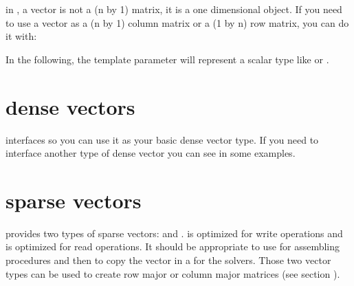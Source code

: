 \documentclass[a4paper,11pt,english]{sphinxmanual}
\begin{document}
in , a vector is not a (n by 1) matrix, it is a one dimensional object. If you need to use a vector as a (n by 1) column matrix or a (1 by n) row matrix, you can do it with:

\begin{sphinxVerbatim}[commandchars=\\\{\}]
 
 
\end{sphinxVerbatim}

In the following, the template parameter  will represent a scalar type like  or .


\section{dense vectors}
\label{\detokenize{gmm/matrix:dense-vectors}}
 interfaces  so you can use it as your basic dense vector type.
If you need to interface another type of dense vector you can see in 
some examples.


\section{sparse vectors}
\label{\detokenize{gmm/matrix:sparse-vectors}}
 provides two types of sparse vectors:  and .  is optimized for write operations and  is optimized for read operations. It should be appropriate to use  for assembling procedures and then to copy the vector in a  for the solvers. Those two vector types can be used to create row major or column major matrices (see section  {\hyperref[\detokenize{gmm/matrix:gmmracmat}]{}}).
\end{document}
